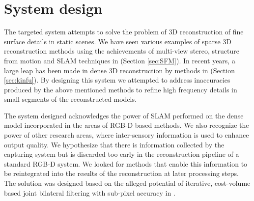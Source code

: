 \documentclass{ucl_thesis}
\newcommand{\secref}[1]{(Section \ref{#1})}
\begin{document}
%		
%		
%	

\chapter{System design} 
\label{chp:my_system}

\par The targeted system attempts to solve the problem of 3D reconstruction of fine surface details in static scenes. We have seen various examples of sparse 3D reconstruction methods using the achievements of multi-view stereo, structure from motion and SLAM techniques in \secref{sec:SFM}. In recent years, a large leap has been made in dense 3D reconstruction by methods in \secref{sec:kinfu}. By designing this system we attempted to address inaccuracies produced by the above mentioned methods to refine high frequency details in small segments of the reconstructed models. \\

\par The system designed acknowledges the power of SLAM performed on the dense model incorporated in the areas of RGB-D based methods. We also recognize the power of other research areas, where inter-sensory information is used to enhance output quality. We hypothesize that there is information collected by the capturing system but is discarded too early in the reconstruction pipeline of a standard RGB-D system. We looked for methods that enable this information to be reintegrated into the results of the reconstruction at later processing steps. The solution was designed based on the alleged potential of iterative, cost-volume based joint bilateral filtering with sub-pixel accuracy in \citep{cvpr-07-qingxiong-yang}. \\
\end{document}
